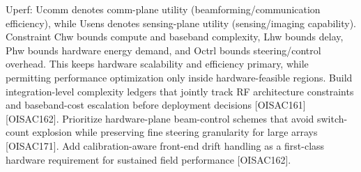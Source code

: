 \markdownRendererDollarSign{}U\markdownRendererUnderscore{}\markdownRendererLeftBrace{}perf\markdownRendererRightBrace{}\markdownRendererDollarSign{}: \markdownRendererDollarSign{}U\markdownRendererUnderscore{}\markdownRendererLeftBrace{}comm\markdownRendererRightBrace{}\markdownRendererDollarSign{} denotes comm-plane utility (beamforming/communication efficiency), while \markdownRendererDollarSign{}U\markdownRendererUnderscore{}\markdownRendererLeftBrace{}sens\markdownRendererRightBrace{}\markdownRendererDollarSign{} denotes sensing-plane utility (sensing/imaging capability). Constraint \markdownRendererDollarSign{}C\markdownRendererUnderscore{}\markdownRendererLeftBrace{}hw\markdownRendererRightBrace{}\markdownRendererDollarSign{} bounds compute and baseband complexity, \markdownRendererDollarSign{}L\markdownRendererUnderscore{}\markdownRendererLeftBrace{}hw\markdownRendererRightBrace{}\markdownRendererDollarSign{} bounds delay, \markdownRendererDollarSign{}P\markdownRendererUnderscore{}\markdownRendererLeftBrace{}hw\markdownRendererRightBrace{}\markdownRendererDollarSign{} bounds hardware energy demand, and \markdownRendererDollarSign{}O\markdownRendererUnderscore{}\markdownRendererLeftBrace{}ctrl\markdownRendererRightBrace{}\markdownRendererDollarSign{} bounds steering/control overhead. This keeps hardware scalability and efficiency primary, while permitting performance optimization only inside hardware-feasible regions.\markdownRendererInterblockSeparator
{}
\markdownRendererSectionEnd \markdownRendererSectionBegin
{}\markdownRendererInterblockSeparator
{}\markdownRendererUlBeginTight
\markdownRendererUlItem Build integration-level complexity ledgers that jointly track RF architecture constraints and baseband-cost escalation before deployment decisions [O\markdownRendererUnderscore{}ISAC\markdownRendererUnderscore{}161][O\markdownRendererUnderscore{}ISAC\markdownRendererUnderscore{}162].\markdownRendererUlItemEnd 
\markdownRendererUlItem Prioritize hardware-plane beam-control schemes that avoid switch-count explosion while preserving fine steering granularity for large arrays [O\markdownRendererUnderscore{}ISAC\markdownRendererUnderscore{}171].\markdownRendererUlItemEnd 
\markdownRendererUlItem Add calibration-aware front-end drift handling as a first-class hardware requirement for sustained field performance [O\markdownRendererUnderscore{}ISAC\markdownRendererUnderscore{}162].\markdownRendererUlItemEnd 
